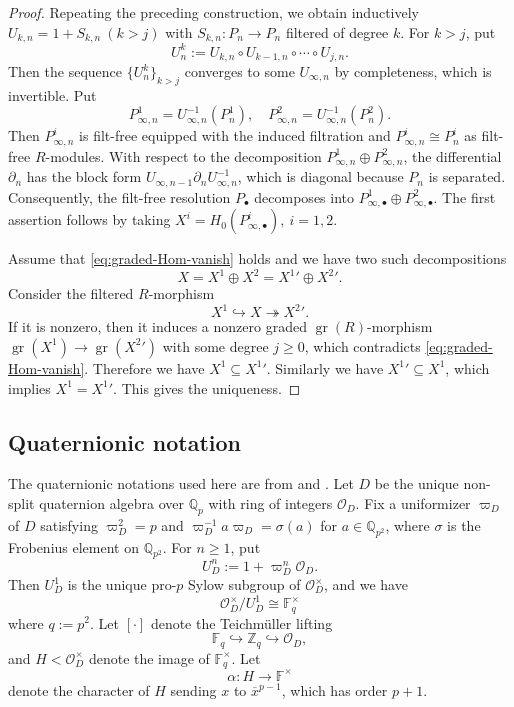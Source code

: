 \documentclass[11pt,a4paper]{article} %
\def\cO{\mathcal{O}}
\def\gr{\operatorname{gr}}
\def\Fq{\mathbb{F}_q}
\def\Qp{\mathbb{Q}_p}
\begin{document}
\begin{proof}
Repeating the preceding construction, we obtain inductively $U_{k,n}=1+S_{k,n}~(k>j)$ with $S_{k,n}:P_n\rightarrow P_n$ filtered of degree $k$. For $k>j$, put 
\[
U_n^k:=U_{k,n}\circ U_{k-1,n}\circ\cdots\circ U_{j,n}.
\]
Then the sequence $\{U_n^k\}_{k>j}$ converges to some $U_{\infty,n}$ by completeness, which is invertible. Put 
\[
P^1_{\infty,n}=U_{\infty,n}^{-1}(P_n^1),\quad P^2_{\infty,n}=U_{\infty,n}^{-1}(P_n^2).
\]
Then $P^i_{\infty,n}$ is filt-free equipped with the induced filtration and $P^i_{\infty,n}\cong P_n^i$ as filt-free $R$-modules. With respect to the decomposition $P^1_{\infty,n}\oplus P^2_{\infty,n}$, the differential $\partial_n$ has the block form $U_{\infty,n-1}\partial_n U_{\infty,n}^{-1}$, which is diagonal because $P_n$ is separated. Consequently, the filt-free resolution $P_\bullet$ decomposes into $P^1_{\infty,\bullet}\oplus P^2_{\infty,\bullet}$. The first assertion follows by taking $X^i=H_0(P^i_{\infty,\bullet}),~i=1,2$.

Assume that \eqref{eq:graded-Hom-vanish} holds and we have two such decompositions 
\[
X=X^1\oplus X^2={X^1}'\oplus {X^2}'.
\]
Consider the filtered $R$-morphism
\[
X^1\hookrightarrow X\twoheadrightarrow {X^2}'.
\]
If it is nonzero, then it induces a nonzero graded $\gr(R)$-morphism $\gr(X^1)\to\gr({X^2}')$ with some degree $j\ge0$, which contradicts \eqref{eq:graded-Hom-vanish}. Therefore we have $X^1\subseteq{X^1}'$. Similarly we have ${X^1}'\subseteq X^1$, which implies $X^1={X^1}'$. This gives the uniqueness.
\end{proof}

\subsection{Quaternionic notation}

The quaternionic notations used here are from \cite{HW24a} and \cite{HW24b}. Let $D$ be the unique non-split quaternion algebra over $\Qp$ with ring of integers $\cO_D$. Fix a uniformizer $\varpi_D$ of $D$ satisfying $\varpi_D^2=p$ and $\varpi_D^{-1}a\varpi_D=\sigma(a)$ for $a\in\mathbb{Q}_{p^2}$, where $\sigma$ is the Frobenius element on $\mathbb{Q}_{p^2}$. For $n\geq1$, put 
\[
U_D^n:=1+\varpi_D^n\cO_D.
\]
Then $U_D^1$ is the unique pro-$p$ Sylow subgroup of $\cO_D^{\times}$, and we have 
\[
\cO_D^{\times}/U_D^1\cong \Fq^{\times}
\]
where $q:=p^2$. Let $[\cdot]$ denote the Teichm\"uller lifting 
\[
\Fq\hookrightarrow \mathbb{Z}_q\hookrightarrow \cO_D,
\]
and $H<\cO_D^{\times}$ denote the image of $\Fq^{\times}$. Let 
\[
\alpha:H\rightarrow\mathbb{F}^{\times}
\]
denote the character of $H$ sending $x$ to $\overline{x}^{p-1}$, which has order $p+1$. 
\end{document}
